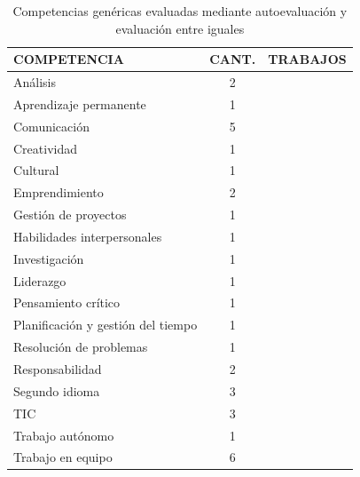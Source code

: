 \begin{table}
  \begin{center}
  \begin{tabular}{| m{6cm} | c | m{5cm} |}
    \hline
    COMPETENCIA & CANT. & TRABAJOS\\
    \hline
    \hline
    Análisis & 2 & \cite{carreras2013promotion,lasa2013problem} \\
    \hline
    Aprendizaje permanente & 1 & \cite{oliver2013graduate} \\
    \hline
    Comunicación & 5 &  \cite{masip2013self,ruizacarate2013soft,carreras2013promotion,martinez2014teamwork,oliver2013graduate} \\
    \hline
    Creatividad & 1 & \cite{piedra2010measuring} \\
    \hline
    Cultural & 1 & \cite{oliver2013graduate} \\
    \hline
    Emprendimiento & 2 & \cite{chang2009international,achcaoucaou2014competence} \\
    \hline
    Gestión de proyectos & 1 & \cite{martinez2014teamwork} \\
    \hline
    Habilidades interpersonales & 1 & \cite{martinez2014teamwork} \\
    \hline
    Investigación & 1 & \cite{oliver2013graduate} \\
    \hline
    Liderazgo & 1 & \cite{martinez2014teamwork} \\
    \hline
    Pensamiento crítico & 1 & \cite{arno2011promoting} \\
    \hline
    Planificación y gestión del tiempo & 1 & \cite{martinez2014teamwork} \\
    \hline
    Resolución de problemas & 1 & \cite{oliver2013graduate} \\
    \hline
    Responsabilidad & 2 & \cite{ruizacarate2013soft,carreras2013promotion} \\
    \hline 
    Segundo idioma & 3 & \cite{renau2010teaching,masip2013self,sevilla2012assessment} \\
    \hline
    TIC & 3 & \cite{lasa2013problem,masip2013self,oliver2013graduate} \\
    \hline
    Trabajo autónomo & 1 &  \cite{lasa2013problem} \\
    \hline
    Trabajo en equipo & 6 &  \cite{lasa2013problem,ficapal2015learning,ruizacarate2013soft,piedra2010measuring,carreras2013promotion,martinez2014teamwork,oliver2013graduate} \\
    \hline
  \end{tabular}
\end{center}
\caption{Competencias genéricas evaluadas mediante autoevaluación y evaluación entre iguales}
\label{tab:CompetenciasAuto}
\end{table}

